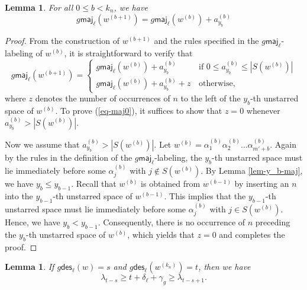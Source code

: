 \documentclass[12pt]{article}
\numberwithin{equation}{section}
\theoremstyle{plain}
\newtheorem{lemma}[theorem]{Lemma}
\def\des{\mathsf{des}}
\def\maj{\mathsf{maj}}
\begin{document}
  
   \begin{lemma}\label{lem-Phi-maj1}
  	For all $0\leq  b<k_n$, we have
  	\begin{equation}\label{eq-maj0}
  		g\maj_\ell(w^{(b+1)}) = 	 g\maj_\ell (w^{(b)})+a^{(b)}_{y_b}
  	\end{equation}
  \end{lemma}
  \begin{proof}
  	 From   the construction of $w^{(b+1)}$ and the rules specified in the $g\maj_\ell$-labeling of $w^{(b)}$,  it is straightforward to verify   that 
  	 $$
  	 g\maj_{\ell}(w^{(b+1)})=\left\{ \begin{array}{ll}
  	 g\maj_{\ell}(w^{(b)})+a^{(b)}_{y_b}&\, \mathrm{if}\,\,   0\leq a^{(b)}_{y_b}\leq  |S(w^{(b)})|  \\
  	 [1em]
  	 g\maj_{\ell}(w^{(b)})+a^{(b)}_{y_b}+z&\, \mathrm{otherwise},
  	 \end{array}
  	 \right.
  	 $$
  	 where $z$ denotes   the number of occurrences of $n$  to the left of  the $y_b$-th unstarred space of $w^{(b)}$. 
  	To prove  (\ref{eq-maj0}), it suffices to show that $z=0$ whenever $a^{(b)}_{y_b}>  |S(w^{(b)})| $. 
  	
  	
  	Now we assume that  $a^{(b)}_{y_b}>  |S(w^{(b)})| $.   Let $w^{(b)}=\alpha^{(b)}_1\alpha^{(b)}_2\ldots \alpha^{(b)}_{m'+b}$.  Again by the rules  in the definition of the  $g\maj_\ell$-labeling,    the $y_b$-th unstarred space must lie  immediately before  some $\alpha^{(b)}_j$ with $j\notin S(w^{(b)})$.       By Lemma  \ref{lem-y_b-maj}, 
  	we have $y_{b}\leq y_{b-1}$.   Recall that $w^{(b)}$ is obtained from $w^{(b-1)}$ by inserting an $n$ into the $y_{b-1}$-th unstarred space of $w^{(b-1)}$.  This implies that the $y_{b-1}$-th  unstarred space   must lie immediately before some $\alpha^{(b)}_j$ with $j\in S(w^{(b)})$. Hence, we have $y_{b}<y_{b-1}$.  Consequently,  there is  no occurrence of $n$   preceding  the $y_b$-th unstarred space of $w^{(b)}$, which yields that  $z=0$ and  completes  the proof. 
  	\end{proof}
  \begin{lemma}\label{lem-Phi-maj3}
  	If $g\des_\ell(w)=s$ and $g\des_\ell(w^{(k_n)})=t$, then we have
  	$$
  	\lambda_{t-s}\geq t+\delta_\ell+\gamma_g \geq \lambda_{t-s+1}.
  	$$
  	
  \end{lemma}
\end{document}
